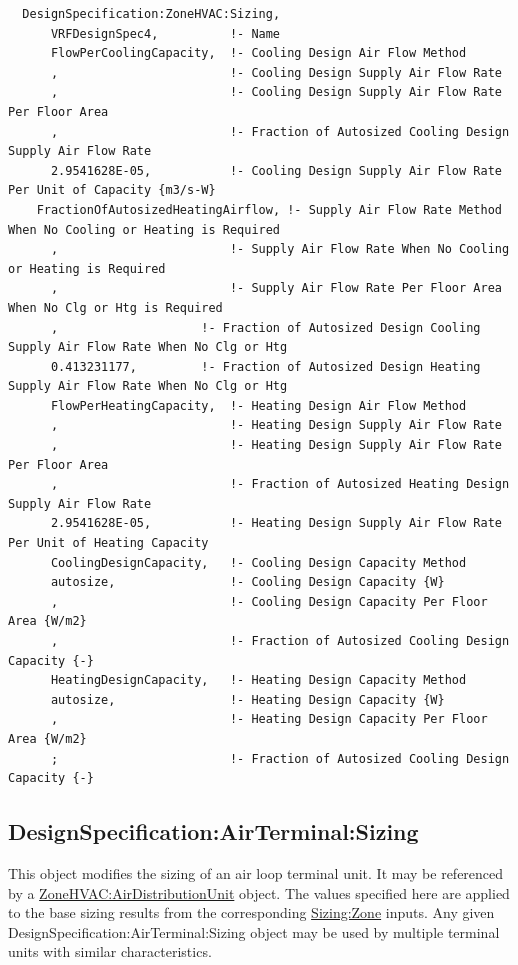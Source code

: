 \begin{lstlisting}
  DesignSpecification:ZoneHVAC:Sizing,
      VRFDesignSpec4,          !- Name
      FlowPerCoolingCapacity,  !- Cooling Design Air Flow Method
      ,                        !- Cooling Design Supply Air Flow Rate
      ,                        !- Cooling Design Supply Air Flow Rate Per Floor Area
      ,                        !- Fraction of Autosized Cooling Design Supply Air Flow Rate
      2.9541628E-05,           !- Cooling Design Supply Air Flow Rate Per Unit of Capacity {m3/s-W}
    FractionOfAutosizedHeatingAirflow, !- Supply Air Flow Rate Method When No Cooling or Heating is Required
      ,                        !- Supply Air Flow Rate When No Cooling or Heating is Required
      ,                        !- Supply Air Flow Rate Per Floor Area When No Clg or Htg is Required
      ,                    !- Fraction of Autosized Design Cooling Supply Air Flow Rate When No Clg or Htg
      0.413231177,         !- Fraction of Autosized Design Heating Supply Air Flow Rate When No Clg or Htg
      FlowPerHeatingCapacity,  !- Heating Design Air Flow Method
      ,                        !- Heating Design Supply Air Flow Rate
      ,                        !- Heating Design Supply Air Flow Rate Per Floor Area
      ,                        !- Fraction of Autosized Heating Design Supply Air Flow Rate
      2.9541628E-05,           !- Heating Design Supply Air Flow Rate Per Unit of Heating Capacity
      CoolingDesignCapacity,   !- Cooling Design Capacity Method
      autosize,                !- Cooling Design Capacity {W}
      ,                        !- Cooling Design Capacity Per Floor Area {W/m2}
      ,                        !- Fraction of Autosized Cooling Design Capacity {-}
      HeatingDesignCapacity,   !- Heating Design Capacity Method
      autosize,                !- Heating Design Capacity {W}
      ,                        !- Heating Design Capacity Per Floor Area {W/m2}
      ;                        !- Fraction of Autosized Cooling Design Capacity {-}
\end{lstlisting}

\subsection{DesignSpecification:AirTerminal:Sizing}\label{designspecificationairterminalsizing}

This object modifies the sizing of an air loop terminal unit. It may be referenced by a \hyperref[zonehvacairdistributionunit]{ZoneHVAC:AirDistributionUnit} object. The values specified here are applied to the base sizing results from the corresponding \hyperref[sizingzone]{Sizing:Zone} inputs. Any given DesignSpecification:AirTerminal:Sizing object may be used by multiple terminal units with similar characteristics.

